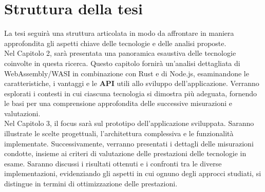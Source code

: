 \section{Struttura della tesi}
\label{sec:struttura}
La tesi seguirà una struttura articolata in modo da affrontare in maniera approfondita gli aspetti chiave delle tecnologie e delle analisi proposte.
\\Nel Capitolo 2, sarà presentata una panoramica esaustiva delle tecnologie coinvolte in questa ricerca. Questo capitolo fornirà un'analisi dettagliata di WebAssembly/WASI in combinazione con Rust e di Node.js, esaminandone le caratteristiche, i vantaggi e le \textbf{API} utili allo sviluppo dell'applicazione.
Verranno esplorati i contesti in cui ciascuna tecnologia si dimostra più adeguata, fornendo le basi per una comprensione approfondita delle successive misurazioni e valutazioni.
\\Nel Capitolo 3, il focus sarà sul prototipo dell'applicazione sviluppata. Saranno illustrate le scelte progettuali, l'architettura complessiva e le funzionalità implementate.
Successivamente, verranno presentati i dettagli delle misurazioni condotte, insieme ai criteri di valutazione delle prestazioni delle tecnologie in esame. 
Saranno discussi i risultati ottenuti e i confronti tra le diverse implementazioni, evidenziando gli aspetti in cui ognuno degli approcci studiati, si distingue in termini di ottimizzazione delle prestazioni.
